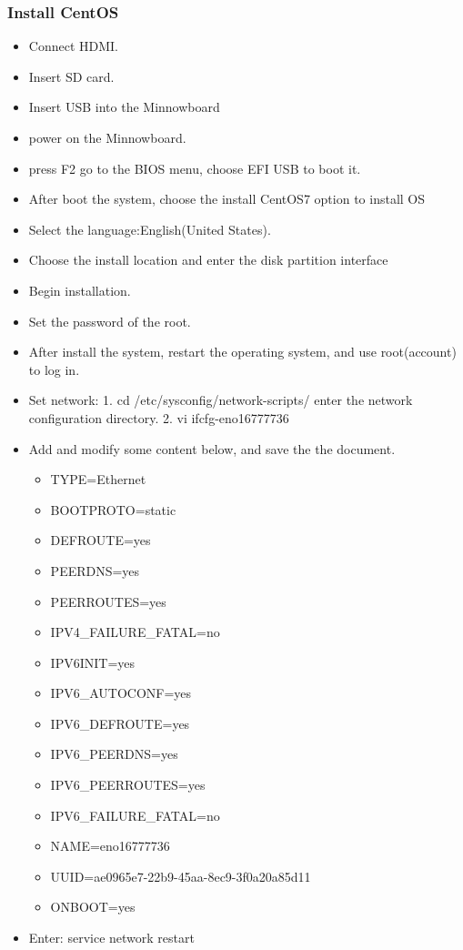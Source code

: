 \documentclass[10pt,draftclsnofoot,peerreview ,letterpaper,onecolumn,]{IEEEtran}
\begin{document}
	\subsubsection{Install CentOS}
	\begin{itemize}
		\item Connect HDMI.
		\item Insert SD card.
		\item Insert USB into the Minnowboard
		\item power on the Minnowboard.
		\item press F2 go to the BIOS menu, choose EFI USB to boot it.
		\item After boot the system, choose the install CentOS7 option to install OS
		\item Select the language:English(United States).
		\item Choose the install location and enter the disk partition interface
		\item Begin installation.
		\item Set the password of the root.
		\item After install the system, restart the operating system, and use root(account) to log in.
		\item Set network:
		  1. cd  /etc/sysconfig/network-scripts/ enter the network configuration directory.
		  2. vi  ifcfg-eno16777736
		\item Add and modify some content below, and save the the document.
		\begin{itemize}
			\item TYPE=Ethernet
			\item BOOTPROTO=static  
			\item DEFROUTE=yes
			\item PEERDNS=yes
			\item PEERROUTES=yes
			\item IPV4\_FAILURE\_FATAL=no
			\item IPV6INIT=yes
			\item IPV6\_AUTOCONF=yes
			\item IPV6\_DEFROUTE=yes
			\item IPV6\_PEERDNS=yes
			\item IPV6\_PEERROUTES=yes
			\item IPV6\_FAILURE\_FATAL=no
			\item NAME=eno16777736
			\item UUID=ae0965e7-22b9-45aa-8ec9-3f0a20a85d11
			\item ONBOOT=yes 
		\end{itemize}
		\item Enter: service network restart
	\end{itemize}
	
\end{document}

